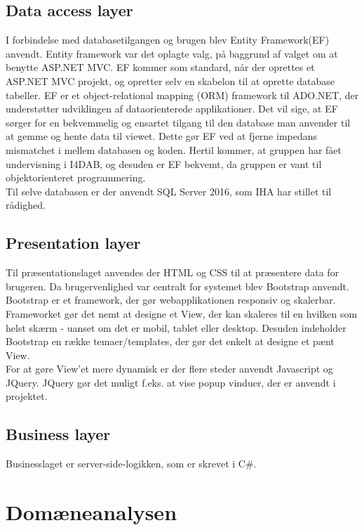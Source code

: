 \subsection{Data access layer}
I forbindelse med databasetilgangen og brugen blev Entity Framework(EF)\cite{ADOEF} anvendt. Entity framework  var det oplagte valg, på baggrund af valget om at benytte ASP.NET MVC. EF kommer som standard, når der oprettes et ASP.NET MVC projekt, og opretter selv en skabelon til at oprette database tabeller. EF er et object-relational mapping (ORM) framework til ADO.NET, der understøtter udviklingen af dataorienterede applikationer. Det vil sige, at EF sørger for en bekvemmelig og ensartet tilgang til den database man anvender til at gemme og hente data til viewet.  Dette gør EF ved at fjerne impedans mismatchet i mellem databasen og koden. Hertil kommer, at gruppen har fået undervisning i I4DAB, og desuden er EF bekvemt, da gruppen er vant til objektorienteret programmering.\\
 \noindent Til selve databasen er der anvendt SQL Server 2016, som IHA har stillet til rådighed.
 
\subsection{Presentation layer}
Til præsentationslaget anvendes der HTML og CSS til at præsentere data for brugeren. Da brugervenlighed var centralt for systemet blev Bootstrap\cite{Bootstrap} anvendt. Bootstrap er et framework, der gør webapplikationen responsiv og skalerbar. Frameworket gør det nemt at designe et View, der kan skaleres til en hvilken som helst skærm - uanset om det er mobil, tablet eller desktop. Desuden indeholder Bootstrap en række temaer/templates, der gør det enkelt at designe et pænt View. \\
For at gøre View'et mere dynamisk er der flere steder anvendt Javascript og JQuery\cite{jQuery}. 
JQuery gør det muligt f.eks. at vise popup vinduer, der er anvendt i projektet.

\subsection{Business layer}
Businesslaget er server-side-logikken, som er skrevet i C\#. 

\section{Domæneanalysen}

